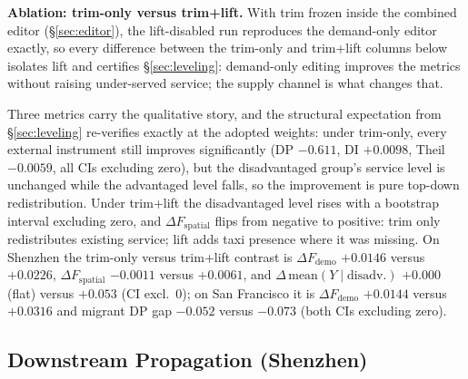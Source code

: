 \textbf{Ablation: trim-only versus trim+lift.}\label{sec:exp-ablation}
With trim frozen inside the combined editor (\S\ref{sec:editor}), the
lift-disabled run reproduces the demand-only editor exactly, so every
difference between the trim-only and trim+lift columns below isolates lift
and certifies \S\ref{sec:leveling}: demand-only editing improves the
metrics without raising under-served service; the supply channel is what
changes that.

Three metrics carry the qualitative story, and the structural expectation from
\S\ref{sec:leveling} re-verifies exactly at the adopted weights: under
trim-only, every external instrument still improves significantly (DP
$-0.611$, DI $+0.0098$, Theil $-0.0059$, all CIs excluding zero), but the
disadvantaged group's service level is unchanged while the advantaged level
falls, so the improvement is pure top-down redistribution. Under trim+lift
the disadvantaged level rises with a bootstrap interval excluding zero, and
$\Delta F_{\mathrm{spatial}}$ flips from negative to positive: trim only
redistributes existing service; lift adds taxi presence where it was
missing. On Shenzhen
the trim-only versus trim+lift contrast is
$\Delta F_{\mathrm{demo}}$ $+0.0146$ versus $+0.0226$, %
$\Delta F_{\mathrm{spatial}}$ $-0.0011$ versus $+0.0061$, and %
$\Delta\,\mathrm{mean}(Y \mid \mathrm{disadv.})$ $+0.000$ (flat) versus $+0.053$ (CI excl.\ 0); %
on San Francisco it is $\Delta F_{\mathrm{demo}}$ $+0.0144$ versus $+0.0316$ %
and migrant DP gap $-0.052$ versus $-0.073$ (both CIs excluding zero). %

\subsection{Downstream Propagation (Shenzhen)}\label{sec:exp-downstream}

